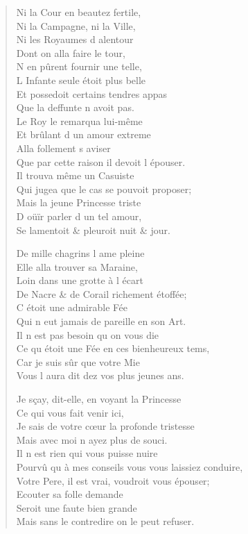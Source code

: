\begin{verse}
\vin Ni la Cour en beautez fertile, \\
\vin Ni la Campagne, ni la Ville, \\
\vin Ni les Royaumes d\textquotesingle{} alentour \\
\vin Dont on alla faire le tour, \\
\vin N\textquotesingle{} en pûrent fournir une telle, \\
\vin L\textquotesingle{} Infante seule étoit plus belle \\
\vin Et possedoit certains tendres appas \\
\vin Que la deffunte n\textquotesingle{} avoit pas. \\
\vin Le Roy le remarqua lui-même \\
\vin Et brûlant d\textquotesingle{} un amour extreme \\
\vin Alla follement s\textquotesingle{} aviser \\
Que par cette raison il devoit l\textquotesingle{} épouser. \\
\vin Il trouva même un Casuiste \\
Qui jugea que le cas se pouvoit proposer; \\
\vin Mais la jeune Princesse triste \\
\vin D\textquotesingle{} oüïr parler d\textquotesingle{} un tel amour, \\
\vin Se lamentoit \& pleuroit nuit \& jour.

\vin De mille chagrins l\textquotesingle{} ame pleine \\
\vin Elle alla trouver sa Maraine, \\
\vin Loin dans une grotte à l\textquotesingle{} écart \\
De Nacre \& de Corail richement étoffée; \\
\vin C\textquotesingle{} étoit une admirable Fée \\
\vin Qui n\textquotesingle{} eut jamais de pareille en son Art. \\
\vin Il n\textquotesingle{} est pas besoin qu\textquotesingle{} on vous die \\
Ce qu\textquotesingle{} étoit une Fée en ces bienheureux tems, \\
\vin Car je suis sûr que votre Mie \\
\vin Vous l\textquotesingle{} aura dit dez vos plus jeunes ans.

\vin Je sçay, dit-elle, en voyant la Princesse \\
\vin\vin Ce qui vous fait venir ici, \\
Je sais de votre cœur la profonde tristesse \\
\vin Mais avec moi n\textquotesingle{} ayez plus de souci. \\
\vin Il n\textquotesingle{} est rien qui vous puisse nuire \\
Pourvû qu\textquotesingle{} à mes conseils vous vous laissiez conduire, \\
Votre Pere, il est vrai, voudroit vous épouser; \\
\vin Ecouter sa folle demande \\
\vin Seroit une faute bien grande \\
Mais sans le contredire on le peut refuser.


\end{verse}
